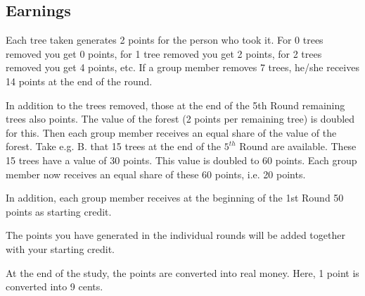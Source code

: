\subsection*{Earnings}

\noindent Each tree taken generates 2 points for the person who took it. For 0 trees removed you get 0 points, for 1 tree removed you get 2 points, for 2 trees removed you get 4 points, etc. If a group member removes 7 trees, he/she receives 14 points at the end of the round.

\noindent In addition to the trees removed, those at the end of the 5th Round remaining trees also points. The value of the forest (2 points per remaining tree) is doubled for this. Then each group member receives an equal share of the value of the forest. Take e.g. B. that 15 trees at the end of the $5^{th}$ Round are available. These 15 trees have a value of 30 points. This value is doubled to 60 points. Each group member now receives an equal share of these 60 points, i.e. 20 points.

\noindent In addition, each group member receives at the beginning of the 1st Round 50 points as starting credit.

\noindent The points you have generated in the individual rounds will be added together with your starting credit.

\noindent At the end of the study, the points are converted into real money. Here, 1 point is converted into 9 cents.
